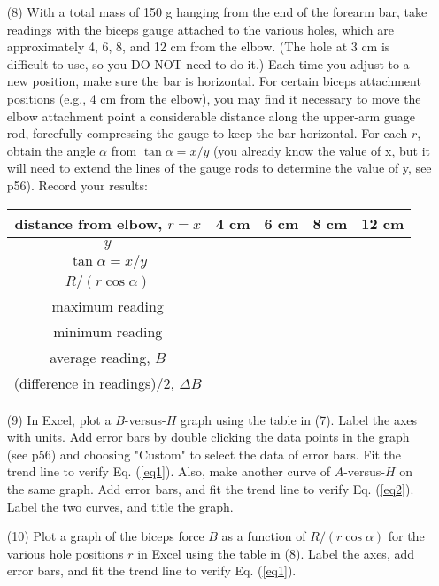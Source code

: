 \documentclass{article}
\begin{document}
\begin{enumerate}
\item[(8)] With a total mass of 150 g hanging from the end of the forearm bar, take readings with the biceps gauge attached to the various holes, which are approximately 4, 6, 8, and 12 cm from the elbow. (The hole at 3 cm is difficult to use, so you DO NOT need to do it.) Each time you adjust to a new position, make sure the bar is horizontal. For certain biceps attachment positions (e.g., 4 cm from the elbow), you may find it necessary to move the elbow attachment point a considerable distance along the upper-arm guage rod, forcefully compressing the gauge to keep the bar horizontal. For each $r$, obtain the angle $\alpha$ from $\tan \alpha = x/y$ (you already know the value of x, but it will need to extend the lines of the gauge rods to determine the value of y, see p56). Record your results:

\begin{tabular}{|c|c|c|c|c|}
\hline
distance from elbow, $r=x$ & 4 cm & 6 cm & 8 cm & 12 cm\\
\hline
$y$ &  &  &  &  \\
\hline
$\tan \alpha=x/y$ &  &  &  & \\
\hline
$R/(r\cos \alpha)$ &  &  &  & \\
\hline
maximum reading &  &  &  & \\
\hline
minimum reading &  &  &  & \\
\hline
average reading, $B$ &  &  &  & \\
\hline
 (difference in readings)/2, $\Delta B$ &  &  &  &  \\
\hline
\end{tabular}

\item[(9)] In Excel, plot a $B$-versus-$H$ graph using the table in (7). Label the axes with units. Add error bars by double clicking the data points in the graph (see p56) and choosing "Custom" to select the data of error bars. Fit the trend line to verify Eq. (\ref{eq1}).%
Also, make another curve of $A$-versus-$H$ on the same graph. Add error bars, and fit the trend line to verify Eq. (\ref{eq2}).%
Label the two curves, and title the graph.

\item[(10)] Plot a graph of the biceps force $B$ as a function of $R/(r \cos \alpha)$ for the various hole positions $r$ in Excel using the table in (8).  Label the axes, add error bars, and fit the trend line to verify Eq. (\ref{eq1}).%

\end{enumerate}
\end{document}
